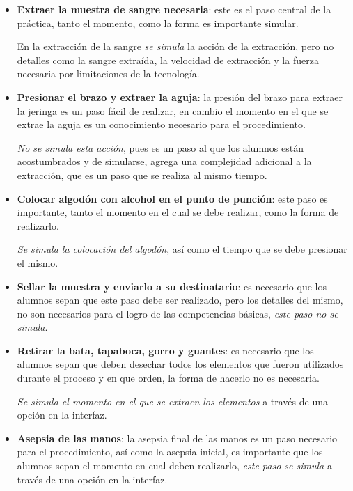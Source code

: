 \begin{itemize}
\item \textbf{Extraer la muestra de sangre necesaria}: este es el paso central
    de la práctica, tanto el momento, como la forma es importante simular.

    En la extracción de la sangre \emph{se simula} la acción de la extracción,
    pero no detalles como la sangre extraída, la velocidad de extracción y la
    fuerza necesaria por limitaciones de la tecnología.

\item \textbf{Presionar el brazo y extraer la aguja}: la presión del brazo para
    extraer la jeringa es un paso fácil de realizar, en cambio el momento en el
    que se extrae la aguja es un conocimiento necesario para el procedimiento.

    \emph{No se simula esta acción}, pues es un paso al que los alumnos están
    acostumbrados y de simularse, agrega una complejidad adicional a la
    extracción, que es un paso que se realiza al mismo tiempo.

\item \textbf{Colocar algodón con alcohol en el punto de punción}: este paso es
    importante, tanto el momento en el cual se debe realizar, como la forma de
    realizarlo.

    \emph{Se simula la colocación del algodón}, así como el tiempo que se debe
    presionar el mismo.

\item \textbf{Sellar la muestra y enviarlo a su destinatario}: es necesario que
    los alumnos sepan que este paso debe ser realizado, pero los detalles del
    mismo, no son necesarios para el logro de las competencias básicas,
    \emph{este paso no se simula}.


\item \textbf{Retirar la bata, tapaboca, gorro y guantes}: es necesario que los
    alumnos sepan que deben desechar todos los elementos que fueron utilizados
    durante el proceso y en que orden, la forma de hacerlo no es necesaria.

    \emph{Se simula el momento en el que se extraen los elementos} a través de
    una opción en la interfaz.

\item \textbf{Asepsia de las manos}: la asepsia final de las manos es un paso
    necesario para el procedimiento, así como la asepsia inicial, es importante
    que los alumnos sepan el momento en cual deben realizarlo, \emph{este paso
        se simula} a través de una opción en la interfaz.

\end{itemize}

